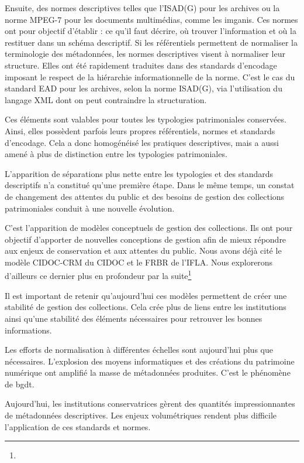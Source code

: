 Ensuite, des normes descriptives telles que l'ISAD(G) pour les archives ou la norme MPEG-7 pour les documents multimédias, comme les \glspl{imgani}. Ces normes ont pour objectif d'établir : ce qu'il faut décrire, où trouver l'information et où la restituer dans un schéma descriptif. Si les référentiels permettent de normaliser la terminologie des métadonnées, les normes descriptives visent à normaliser leur structure. Elles ont été rapidement traduites dans des standards d'encodage imposant le respect de la hiérarchie informationnelle de la norme. C'est le cas du standard EAD pour les archives, selon la norme ISAD(G), via l'utilisation du langage XML dont on peut contraindre la structuration. 

Ces éléments sont valables pour toutes les typologies patrimoniales conservées. Ainsi, elles possèdent parfois leurs propres référentiels, normes et standards d'encodage. Cela a donc homogénéisé les pratiques descriptives, mais a aussi amené à plus de distinction entre les typologies patrimoniales.\newline

L'apparition de séparations plus nette entre les typologies et des standards descriptifs n'a constitué qu'une première étape. Dans le même temps, un constat de changement des attentes du public et des besoins de gestion des collections patrimoniales conduit à une nouvelle évolution. 

C'est l'apparition de modèles conceptuels de gestion des collections. Ils ont pour objectif d'apporter de nouvelles conceptions de gestion afin de mieux répondre aux enjeux de conservation et aux attentes du public. Nous avons déjà cité le modèle CIDOC-CRM du \gls{CIDOC} et le FRBR de l'\gls{IFLA}. Nous explorerons d'ailleurs ce dernier plus en profondeur par la suite\footnote{}

Il est important de retenir qu'aujourd'hui ces modèles permettent de créer une stabilité de gestion des collections. Cela crée plus de liens entre les institutions ainsi qu'une stabilité des éléments nécessaires pour retrouver les bonnes informations.\newline

Les efforts de normalisation à différentes échelles sont aujourd'hui plus que nécessaires. L'explosion des moyens informatiques et des créations du patrimoine numérique ont amplifié la masse de métadonnées produites. C'est le phénomène de \gls{bgdt}.

Aujourd'hui, les institutions conservatrices gèrent des quantités impressionnantes de métadonnées descriptives. Les enjeux volumétriques rendent plus difficile l'application de ces standards et normes.

